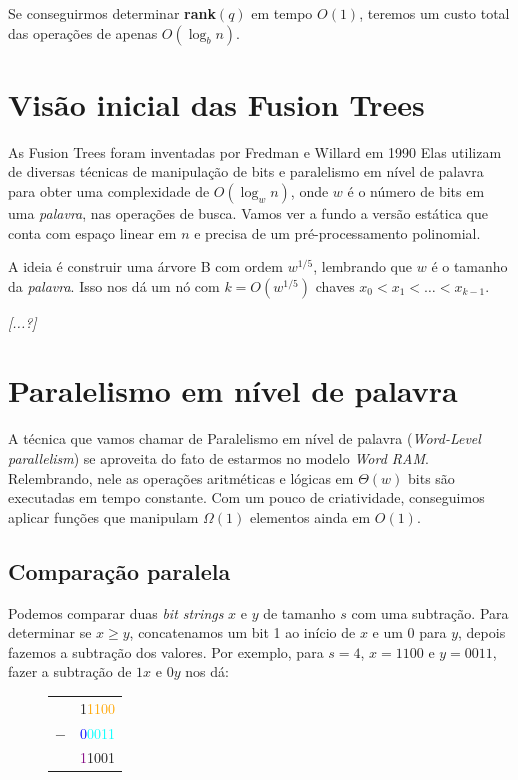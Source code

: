 Se conseguirmos determinar \textbf{rank}$(q)$ em tempo $O(1)$, teremos um custo
total das operações de apenas $O(\log_b n)$. 

\section{Visão inicial das Fusion Trees}

As Fusion Trees foram inventadas por Fredman e Willard em 1990 Elas utilizam de
diversas técnicas de manipulação de bits e paralelismo em nível de palavra para
obter uma complexidade de $O(\log_w n)$, onde $w$ é o número de bits em uma
\textit{palavra}, nas operações de busca. Vamos ver a fundo a versão estática
que conta com espaço linear em $n$ e precisa de um pré-processamento polinomial.

A ideia é construir uma árvore B com ordem $w^{1/5}$, lembrando que $w$ é o
tamanho da \textit{palavra}. Isso nos dá um nó com $k=O(w^{1/5})$ chaves
$x_0<x_1<\dots<x_{k-1}$. 

\textit{[...?]}

\section{Paralelismo em nível de palavra}

A técnica que vamos chamar de Paralelismo em nível de palavra
(\textit{Word-Level parallelism}) se aproveita do fato de estarmos no modelo
\textit{Word RAM}. Relembrando, nele as operações aritméticas e lógicas em
$\Theta(w)$ bits são executadas em tempo constante. Com um pouco de
criatividade, conseguimos aplicar funções que manipulam $\Omega(1)$ elementos
ainda em $O(1)$.

\subsection{Comparação paralela}

Podemos comparar duas \textit{bit strings} $x$ e $y$ de tamanho $s$ com uma
subtração. Para determinar se $x\geq y$, concatenamos um bit 1 ao início de $x$
e um 0 para $y$, depois fazemos a subtração dos valores. Por exemplo, para
$s=4$, $x=1100$ e $y=0011$, fazer a subtração de $1x$ e $0y$ nos dá:

\begin{figure}[h]
\bf \Large \centering
\begin{tabular}{cc}
& \textcolor{RawSienna}{1}\textcolor{Orange}{1100} \\
$-$ & \textcolor{blue}{0}\textcolor{cyan}{0011} \\
\hline
& \textcolor{Purple}{1}\textcolor{CarnationPink}{1001} 
\end{tabular}
\end{figure}

